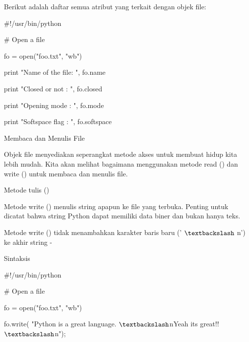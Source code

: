 \vspace{12pt}
\noindent 
Berikut adalah daftar semua atribut yang terkait dengan objek file: \par
\vspace{16pt}
\vspace{16pt}
\vspace{16pt}
\noindent 
 $  \#  $!/usr/bin/python \par
\vspace{12pt}
\noindent 
 $  \#  $ Open a file \par
\noindent 
fo = open("foo.txt", "wb") \par
\noindent 
print "Name of the file: ", fo.name \par
\noindent 
print "Closed or not : ", fo.closed \par
\noindent 
print "Opening mode : ", fo.mode \par
\noindent 
print "Softspace flag : ", fo.softspace \par
\vspace{12pt}
\noindent 
Membaca dan Menulis File \par
\vspace{12pt}
\noindent 
Objek file menyediakan seperangkat metode akses untuk membuat hidup kita lebih mudah. Kita akan melihat bagaimana menggunakan metode read () dan write () untuk membaca dan menulis file. \par
\noindent 
Metode tulis () \par
\vspace{12pt}
\noindent 
Metode write () menulis string apapun ke file yang terbuka. Penting untuk dicatat bahwa string Python dapat memiliki data biner dan bukan hanya teks. \par
\vspace{12pt}
\noindent 
Metode write () tidak menambahkan karakter baris baru (' $  \textbackslash  $ n') ke akhir string - \par
\noindent 
Sintaksis \par
\vspace{12pt}
\noindent 
 $  \#  $!/usr/bin/python \par
\vspace{12pt}
\noindent 
 $  \#  $ Open a file \par
\noindent 
fo = open("foo.txt", "wb") \par
\noindent 
fo.write( "Python is a great language. $  \textbackslash  $nYeah its great!! $  \textbackslash  $n"); \par
\vspace{12pt}
